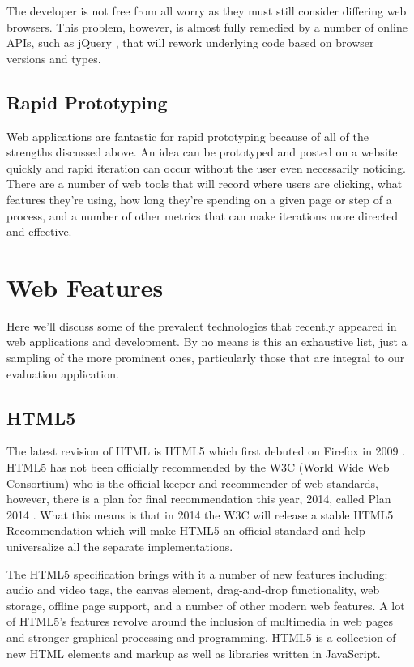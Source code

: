 \documentclass[12pt]{ucthesis}
\begin{document}
The developer is not free from all worry as they must still consider differing web browsers. This problem, however, is almost fully remedied by a number of online APIs, such as jQuery \cite{jQuery}, that will rework underlying code based on browser versions and types. 

\subsection{Rapid Prototyping}
Web applications are fantastic for rapid prototyping because of all of the strengths discussed above. An idea can be prototyped and posted on a website quickly and rapid iteration can occur without the user even necessarily noticing. There are a number of web tools that will record where users are clicking, what features they're using, how long they're spending on a given page or step of a process, and a number of other metrics that can make iterations more directed and effective.

\section{Web Features}
Here we'll discuss some of the prevalent technologies that recently appeared in web applications and development. By no means is this an exhaustive list, just a sampling of the more prominent ones, particularly those that are integral to our evaluation application.

\subsection{HTML5}
The latest revision of HTML is HTML5 which first debuted on Firefox in 2009 \cite{EvolutionOfWeb}. HTML5 has not been officially recommended by the W3C (World Wide Web Consortium) who is the official keeper and recommender of web standards, however, there is a plan for final recommendation this year, 2014, called Plan 2014 \cite{Plan2014}. What this means is that in 2014 the W3C will release a stable HTML5 Recommendation which will make HTML5 an official standard and help universalize all the separate implementations.

The HTML5 specification brings with it a number of new features including: audio and video tags, the canvas element, drag-and-drop functionality, web storage, offline page support, and a number of other modern web features. A lot of HTML5's features revolve around the inclusion of multimedia in web pages and stronger graphical processing and programming. HTML5 is a collection of new HTML elements and markup as well as libraries written in JavaScript.
\end{document}
